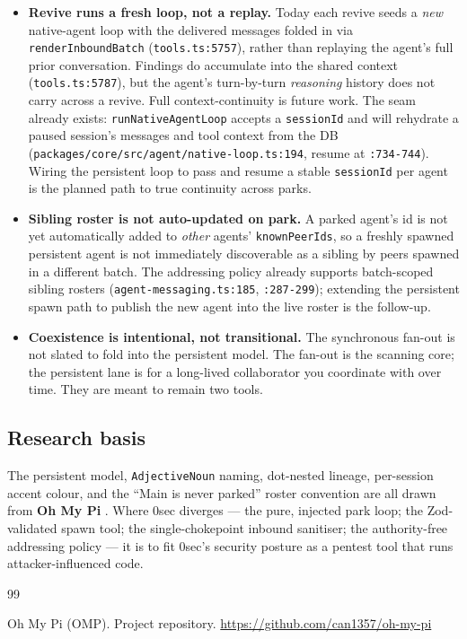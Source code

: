 \documentclass[11pt]{article}
\begin{document}
\begin{itemize}[leftmargin=*]
  \item \textbf{Revive runs a fresh loop, not a replay.} Today each revive seeds a
  \textit{new} native-agent loop with the delivered messages folded in via
  \texttt{renderInboundBatch} (\texttt{tools.ts:5757}), rather than replaying the
  agent's full prior conversation. Findings do accumulate into the shared context
  (\texttt{tools.ts:5787}), but the agent's turn-by-turn \textit{reasoning} history
  does not carry across a revive. Full context-continuity is future work. The seam
  already exists: \texttt{runNativeAgentLoop} accepts a \texttt{sessionId} and will
  rehydrate a paused session's messages and tool context from the DB
  (\texttt{packages/core/src/agent/native-loop.ts:194}, resume at \texttt{:734-744}).
  Wiring the persistent loop to pass and resume a stable \texttt{sessionId} per
  agent is the planned path to true continuity across parks.
  \item \textbf{Sibling roster is not auto-updated on park.} A parked agent's id is
  not yet automatically added to \textit{other} agents' \texttt{knownPeerIds}, so a
  freshly spawned persistent agent is not immediately discoverable as a sibling by
  peers spawned in a different batch. The addressing policy already supports
  batch-scoped sibling rosters (\texttt{agent-messaging.ts:185}, \texttt{:287-299});
  extending the persistent spawn path to publish the new agent into the live roster
  is the follow-up.
  \item \textbf{Coexistence is intentional, not transitional.} The synchronous
  fan-out is not slated to fold into the persistent model. The fan-out is the
  scanning core; the persistent lane is for a long-lived collaborator you
  coordinate with over time. They are meant to remain two tools.
\end{itemize}

\subsection{Research basis}

The persistent model, \texttt{AdjectiveNoun} naming, dot-nested lineage,
per-session accent colour, and the ``Main is never parked'' roster convention are
all drawn from \textbf{Oh My Pi} \citep{omp}. Where 0sec diverges --- the pure,
injected park loop; the Zod-validated spawn tool; the single-chokepoint inbound
sanitiser; the authority-free addressing policy --- it is to fit 0sec's security
posture as a pentest tool that runs attacker-influenced code.

\begin{thebibliography}{99}

Oh My Pi (OMP). Project repository.
\url{https://github.com/can1357/oh-my-pi}

\end{thebibliography}
\end{document}
